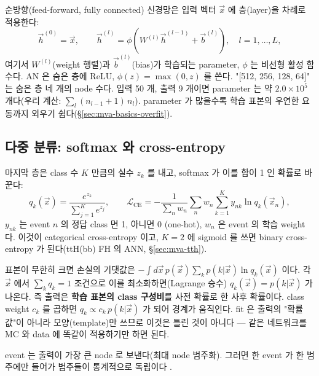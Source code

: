 순방향(feed-forward, fully connected) 신경망은 입력 벡터 $\vec{x}$ 에 층(layer)을 차례로 적용한다:
\begin{equation}
  \vec{h}^{(0)}=\vec{x},\qquad
  \vec{h}^{(l)}=\phi\!\left(W^{(l)}\vec{h}^{(l-1)}+\vec{b}^{(l)}\right),\quad l=1,\dots,L,
  \label{eq:mva-ffnn}
\end{equation}
여기서 $W^{(l)}$(weight 행렬)과 $\vec{b}^{(l)}$(bias)가 학습되는 parameter, $\phi$ 는 비선형 활성 함수다.
AN 은 숨은 층에 ReLU, $\phi(z)=\max(0,z)$ 를 쓴다. "[512, 256, 128, 64]" 는 숨은 층 네 개의
node 수다. 입력 50 개, 출력 9 개이면 parameter 는 약 $2.0\times10^{5}$ 개다(우리 계산: $\sum_l (n_{l-1}+1)\,n_l$).
parameter 가 많을수록 학습 표본의 우연한 요동까지 외우기 쉽다(\S\ref{sec:mva-basics-overfit}).

\subsection{다중 분류: softmax 와 cross-entropy}\label{sec:mva-basics-ce}

마지막 층은 class 수 $K$ 만큼의 실수 $z_k$ 를 내고, softmax 가 이를 합이 1 인 확률로 바꾼다:
\begin{equation}
  q_k(\vec{x})=\frac{e^{z_k}}{\sum_{j=1}^{K}e^{z_j}},\qquad
  \mathcal{L}_{\mathrm{CE}}=-\frac{1}{\sum_n w_n}\sum_{n} w_n\sum_{k=1}^{K} y_{nk}\ln q_k(\vec{x}_n),
  \label{eq:mva-softmax-ce}
\end{equation}
$y_{nk}$ 는 event $n$ 의 정답 class 면 1, 아니면 0 (one-hot), $w_n$ 은 event 의 학습 weight 다. 이것이 categorical cross-entropy 이고,
$K=2$ 에 sigmoid 를 쓰면 binary cross-entropy 가 된다(ttH(bb) FH 의 ANN, \S\ref{sec:mva-tth}).

\begin{note}
표본이 무한히 크면 손실의 기댓값은 $-\int d\vec{x}\,p(\vec{x})\sum_k p(k|\vec{x})\ln q_k(\vec{x})$ 이다. 각 $\vec{x}$ 에서 $\sum_k q_k=1$
조건으로 이를 최소화하면(Lagrange 승수) $q_k(\vec{x})=p(k|\vec{x})$ 가 나온다. 즉 출력은 \textbf{학습 표본의 class 구성비}를 사전 확률로 한
사후 확률이다. class weight $c_k$ 를 곱하면 $q_k\propto c_k\,p(k|\vec{x})$ 가 되어 경계가 움직인다. fit 은 출력의 "확률 값"이 아니라
모양(template)만 쓰므로 이것은 틀린 것이 아니다 — 같은 네트워크를 MC 와 data 에 똑같이 적용하기만 하면 된다.
\end{note}

event 는 출력이 가장 큰 node 로 보낸다(최대 node 범주화). 그러면 한 event 가 한 범주에만 들어가 범주들이 통계적으로 독립이다
.

